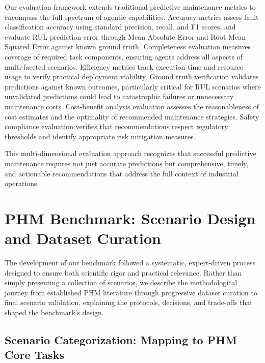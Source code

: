 \documentclass[conference]{IEEEtran}
\begin{document}
Our evaluation framework extends traditional predictive maintenance metrics to encompass the full spectrum of agentic capabilities. Accuracy metrics assess fault classification accuracy using standard precision, recall, and F1 scores, and evaluate RUL prediction error through Mean Absolute Error and Root Mean Squared Error against known ground truth. Completeness evaluation measures coverage of required task components, ensuring agents address all aspects of multi-faceted scenarios. Efficiency metrics track execution time and resource usage to verify practical deployment viability. Ground truth verification validates predictions against known outcomes, particularly critical for RUL scenarios where unvalidated predictions could lead to catastrophic failures or unnecessary maintenance costs. Cost-benefit analysis evaluation assesses the reasonableness of cost estimates and the optimality of recommended maintenance strategies. Safety compliance evaluation verifies that recommendations respect regulatory thresholds and identify appropriate risk mitigation measures.

This multi-dimensional evaluation approach recognizes that successful predictive maintenance requires not just accurate predictions but comprehensive, timely, and actionable recommendations that address the full context of industrial operations.

\section{PHM Benchmark: Scenario Design and Dataset Curation}

The development of our benchmark followed a systematic, expert-driven process designed to ensure both scientific rigor and practical relevance. Rather than simply presenting a collection of scenarios, we describe the methodological journey from established PHM literature through progressive dataset curation to final scenario validation, explaining the protocols, decisions, and trade-offs that shaped the benchmark's design.

\subsection{Scenario Categorization: Mapping to PHM Core Tasks}
\end{document}
